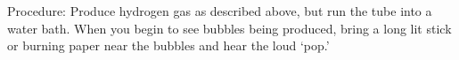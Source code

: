 \begin{multicols}{2}
\begin{description*}
\item[Procedure:]{Produce hydrogen gas as described above, but run the tube into a water bath. When you begin to see bubbles being produced, bring a long lit stick or burning paper near the bubbles and hear the loud `pop.'}
\end{description*}



\end{multicols}

\pagebreak
